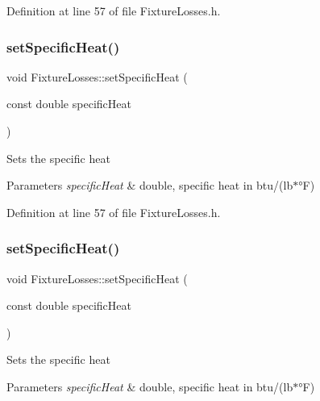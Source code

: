 Definition at line 57 of file Fixture\+Losses.\+h.

\mbox{\label{class_fixture_losses_a946e4b6da1cca9f27e57f97688499ee1}} 
\subsubsection{\texorpdfstring{set\+Specific\+Heat()}{setSpecificHeat()}\hspace{0.1cm}{\footnotesize\ttfamily [2/3]}}
{\footnotesize\ttfamily void Fixture\+Losses\+::set\+Specific\+Heat (\begin{DoxyParamCaption}\item[{const double}]{specific\+Heat }\end{DoxyParamCaption})\hspace{0.3cm}{\ttfamily [inline]}}

Sets the specific heat 
\begin{DoxyParams}{Parameters}
{\em specific\+Heat} & double, specific heat in btu/(lb$\ast$°F) \\
\hline
\end{DoxyParams}


Definition at line 57 of file Fixture\+Losses.\+h.

\mbox{\label{class_fixture_losses_a946e4b6da1cca9f27e57f97688499ee1}} 
\subsubsection{\texorpdfstring{set\+Specific\+Heat()}{setSpecificHeat()}\hspace{0.1cm}{\footnotesize\ttfamily [3/3]}}
{\footnotesize\ttfamily void Fixture\+Losses\+::set\+Specific\+Heat (\begin{DoxyParamCaption}\item[{const double}]{specific\+Heat }\end{DoxyParamCaption})\hspace{0.3cm}{\ttfamily [inline]}}

Sets the specific heat 
\begin{DoxyParams}{Parameters}
{\em specific\+Heat} & double, specific heat in btu/(lb$\ast$°F) \\
\hline
\end{DoxyParams}


